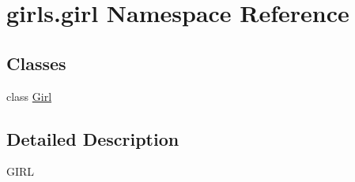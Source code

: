 \hypertarget{namespacegirls_1_1girl}{}\section{girls.\+girl Namespace Reference}
\label{namespacegirls_1_1girl}
\subsection*{Classes}
\begin{DoxyCompactItemize}
\item 
class \hyperlink{classgirls_1_1girl_1_1_girl}{Girl}
\end{DoxyCompactItemize}


\subsection{Detailed Description}
\begin{DoxyVerb}GIRL\end{DoxyVerb}
 
